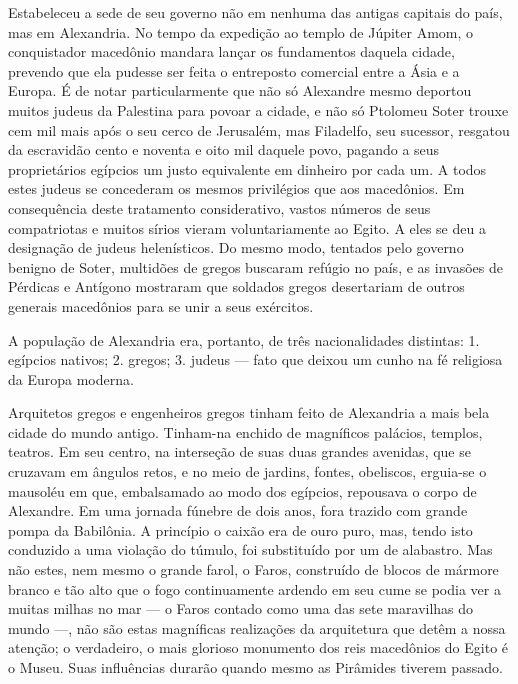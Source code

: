 \documentclass[11pt,a5paper,twoside,openany]{book}
\begin{document}
Estabeleceu a sede de seu governo não em nenhuma das antigas capitais do país, mas em Alexandria. No tempo da expedição ao templo de Júpiter Amom, o conquistador macedônio mandara lançar os fundamentos daquela cidade, prevendo que ela pudesse ser feita o entreposto comercial entre a Ásia e a Europa. É de notar particularmente que não só Alexandre mesmo deportou muitos judeus da Palestina para povoar a cidade, e não só Ptolomeu Soter trouxe cem mil mais após o seu cerco de Jerusalém, mas Filadelfo, seu sucessor, resgatou da escravidão cento e noventa e oito mil daquele povo, pagando a seus proprietários egípcios um justo equivalente em dinheiro por cada um. A todos estes judeus se concederam os mesmos privilégios que aos macedônios. Em consequência deste tratamento considerativo, vastos números de seus compatriotas e muitos sírios vieram voluntariamente ao Egito. A eles se deu a designação de judeus helenísticos. Do mesmo modo, tentados pelo governo benigno de Soter, multidões de gregos buscaram refúgio no país, e as invasões de Pérdicas e Antígono mostraram que soldados gregos desertariam de outros generais macedônios para se unir a seus exércitos.

A população de Alexandria era, portanto, de três nacionalidades distintas: 1. egípcios nativos; 2. gregos; 3. judeus — fato que deixou um cunho na fé religiosa da Europa moderna.

Arquitetos gregos e engenheiros gregos tinham feito de Alexandria a mais bela cidade do mundo antigo. Tinham-na enchido de magníficos palácios, templos, teatros. Em seu centro, na interseção de suas duas grandes avenidas, que se cruzavam em ângulos retos, e no meio de jardins, fontes, obeliscos, erguia-se o mausoléu em que, embalsamado ao modo dos egípcios, repousava o corpo de Alexandre. Em uma jornada fúnebre de dois anos, fora trazido com grande pompa da Babilônia. A princípio o caixão era de ouro puro, mas, tendo isto conduzido a uma violação do túmulo, foi substituído por um de alabastro. Mas não estes, nem mesmo o grande farol, o Faros, construído de blocos de mármore branco e tão alto que o fogo continuamente ardendo em seu cume se podia ver a muitas milhas no mar — o Faros contado como uma das sete maravilhas do mundo —, não são estas magníficas realizações da arquitetura que detêm a nossa atenção; o verdadeiro, o mais glorioso monumento dos reis macedônios do Egito é o Museu. Suas influências durarão quando mesmo as Pirâmides tiverem passado.
\end{document}
